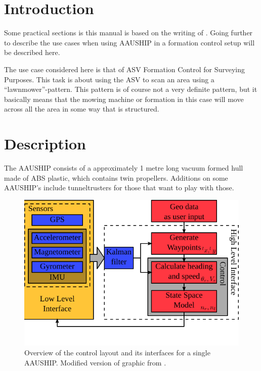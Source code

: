 \section{Introduction}

Some practical sections is this manual is based on the writing of
\cite{12gr730}. Going further to describe the use cases when using
AAUSHIP in a formation control setup will be described here.

The use case considered here is that of \ac{ASV} Formation Control for
Surveying Purposes. This task is about using the \ac{ASV} to scan an
area using a ``lawnmower''-pattern. This pattern is of course not a
very definite pattern, but it basically means that the mowing machine
or formation in this case will move across all the area in some way
that is structured.

\section{Description} The AAUSHIP consists of a approximately 1 metre
long vacuum formed hull made of ABS plastic, which contains twin
propellers. Additions on some AAUSHIP's include tunneltrusters for
those that want to play with those.

\begin{figure}[htbp]
	\includegraphics[width=\textwidth]{fig/vessel-block-overview}
	\caption{Overview of the control layout and its interfaces for a
		single AAUSHIP.
		Modified version of graphic from \citep{12gr730}.}
	\label{fig:vessel-block-overview}
\end{figure}
